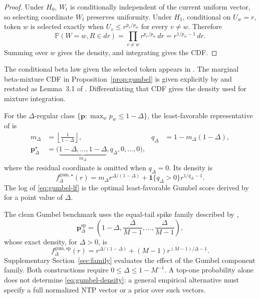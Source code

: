 \documentclass[11pt]{article}
\newcommand{\Prb}{\mathbb P}
\newcommand{\ind}{\mathbf 1}
\newcommand{\bP}{\bm p}
\begin{document}
\begin{proof}
Under $H_0$, $W_t$ is conditionally independent of the current uniform vector, so selecting coordinate $W_t$ preserves uniformity.  Under $H_1$, conditional on $U_w=r$, token $w$ is selected exactly when $U_v\le r^{p_v/p_w}$ for every $v\ne w$.  Therefore
\[
  \Prb(W=w,R\in dr)
  =\prod_{v\ne w}r^{p_v/p_w}\,dr
  =r^{1/p_w-1}\,dr.
\]
Summing over $w$ gives the density, and integrating gives the CDF.
\end{proof}

The conditional beta law given the selected token appears in \citet{fernandez2023three}.  The marginal beta-mixture CDF in Proposition~\ref{prop:gumbel} is given explicitly by \citet{piet2025mark} and restated as Lemma~3.1 of \citet{li2025framework}.  Differentiating that CDF gives the density used for mixture integration.

For the $\Delta$-regular class $\{\bP:\max_w p_w\le 1-\Delta\}$, the least-favorable representative of \citet{li2025framework} is
\begin{align}
  m_\Delta&=\left\lfloor\frac{1}{1-\Delta}\right\rfloor,
  &q_\Delta&=1-m_\Delta(1-\Delta),\\
  \bP_\Delta^\star
  &=\big(\underbrace{1-\Delta,\ldots,1-\Delta}_{m_\Delta},q_\Delta,0,\ldots,0\big),
  \label{eq:least-fav}
\end{align}
where the residual coordinate is omitted when $q_\Delta=0$.  Its density is
\begin{equation}
  f_\Delta^{\mathrm{gum},\star}(r)
  =m_\Delta r^{\Delta/(1-\Delta)}
  +\ind\{q_\Delta>0\}r^{1/q_\Delta-1}.
  \label{eq:gumbel-lf}
\end{equation}
The log of \eqref{eq:gumbel-lf} is the optimal least-favorable Gumbel score derived by \citet{li2025framework} for a point value of $\Delta$.

The clean Gumbel benchmark uses the equal-tail spike family described by \citet{li2025framework},
\begin{equation}
  \bP_\Delta^{\mathrm{sp}}
  =\left(1-\Delta,\frac{\Delta}{M-1},\ldots,\frac{\Delta}{M-1}\right),
  \label{eq:spike-ntp}
\end{equation}
whose exact density, for $\Delta>0$, is
\begin{equation}
  f_\Delta^{\mathrm{gum},\mathrm{sp}}(r)
  =r^{\Delta/(1-\Delta)}
   +(M-1)r^{(M-1)/\Delta-1}.
  \label{eq:gumbel-spike}
\end{equation}
Supplementary Section~\ref{sec:family} evaluates the effect of the Gumbel component family.  Both constructions require $0\le\Delta\le1-M^{-1}$.  A top-one probability alone does not determine \eqref{eq:gumbel-density}: a general empirical alternative must specify a full normalized NTP vector or a prior over such vectors.
\end{document}
